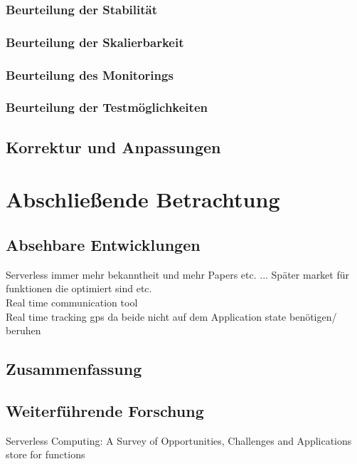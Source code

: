 \documentclass[11pt]{article}
\begin{document}
\subsubsection{Beurteilung der Stabilität}
\subsubsection{Beurteilung der Skalierbarkeit} 
\subsubsection{Beurteilung des Monitorings}
\subsubsection{Beurteilung der Testmöglichkeiten} 
\subsection{Korrektur und Anpassungen}
\section{Abschließende Betrachtung}
\subsection{Absehbare Entwicklungen}
\cite{al2019systematic} Serverless  immer mehr bekanntheit und mehr Papers etc. ... Später market für funktionen die optimiert sind etc. \cite{shafiei2020serverless}\\
Real time communication tool  \cite{shafiei2020serverless} \\
Real time tracking gps  \cite{shafiei2020serverless} da beide nicht auf dem Application state benötigen/ beruhen  \cite{shafiei2020serverless} \\
\cite{hellerstein2018serverless}
\subsection{Zusammenfassung}
\subsection{Weiterführende Forschung}
Serverless Computing: A Survey of Opportunities, Challenges and Applications store for functions
\cite{shahrad2019architectural}
\newpage
\printbibliography[title={Literaturverzeichnis}]
\end{document}
